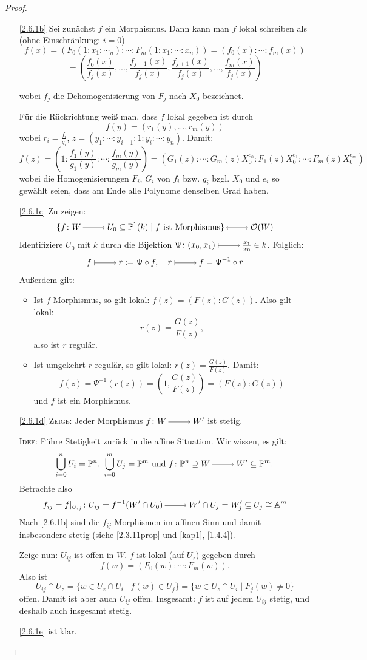 \documentclass[a4paper,12pt]{scrbook}
\theoremstyle{keinenummern} %
\theoremstyle{mitnummern}
\theoremstyle{unserbeweis}
\newtheorem{proof}{Beweis}
\def\A{\mathbb{A}}
\def\O{\mathcal{O}}
\def\P{\mathbb{P}}
\newcommand{\restrict}[1]{|_{#1}}
\renewcommand{\dotsc}{\ensuremath{\!...}}
\newcommand{\ra}{\raisebox{-1pt}{\tikz{\draw[thin,shorten >=3pt, ->] (0,0) node{\hspace*{-2pt}} -- node{} (1,0);}}\penalty1000\relax}
\renewcommand{\mapsto}{\raisebox{-1pt}{\tikz{\draw[thin,shorten >=3pt, |->] (0,0) node{\hspace*{0pt}} -- node{} (1,0);}}\penalty1000\relax}
\newcommand{\lra}{\raisebox{-1pt}{\tikz{\draw[thin,shorten >=3pt, <->] (0,0) node{\hspace*{-2pt}} -- node{} (1,0);}}\penalty1000\relax}
\begin{document}
\begin{proof}
  \begin{enumerate}
  \item[\ref{2.6.1b}] Sei zunächst $f$ ein Morphismus. Dann kann man $f$ lokal schreiben als (ohne Einschränkung: $i=0$)
\[f(x)=(F_0(1:x_1:\dotsm_n):\dotsm:F_m(1:x_1:\dotsm:x_n))=(f_0(x):\dotsm :f_m(x))\]
\[=(\frac {f_0(x)}{f_j(x)},\dotsc,\frac{f_{j-1}(x)}{f_j(x)},\frac{f_{j+1}(x)}{f_j(x)},\dotsc,\frac {f_m(x)}{f_j(x)})\]

wobei $f_j$ die Dehomogenisierung von $F_j$ nach $X_0$ bezeichnet.

Für die Rückrichtung weiß man, dass $f$ lokal gegeben ist durch 
\[f(y)=(r_1(y),\dotsc,r_m(y))\]
wobei $r_i=\frac{f_i}{g_i}$, $z=(y_1:\dotsm:y_{i-1}:1:y_i:\dotsm :y_n)$. Damit:
\[ f(z)=(1:\frac{f_1(y)}{g_1(y)}:\dotsm :\frac{f_m(y)}{g_m(y)})=(G_1(z):\dotsm :G_m(z)X_0^{e_0}:F_1(z)X_0^{e_1}: \dotsm :F_m(z)X_0^{e_m})\]
wobei die Homogenisierungen $F_i$, $G_i$ von $f_i$ bzw. $g_i$ bzgl. $X_0$ und $e_i$ so gewählt seien, dass am Ende alle Polynome denselben Grad haben.  
  \item[\ref{2.6.1c}] Zu zeigen:
\[\{f\colon W\ra U_0\subseteq \P^1(k) \mid f \text{ ist Morphismus}\} \lra \O(W)\]
Identifiziere $U_0$ mit $k$ durch die Bijektion $\Psi \colon (x_0,x_1)\mapsto \frac{x_1}{x_0} \in k$. Folglich:
\[f\mapsto r:=\Psi \circ f, \quad r\mapsto f=\Psi^{-1}\circ r\]
Außerdem gilt:\begin{itemize}
    \item Ist $f$ Morphismus, so gilt lokal: $f(z)=(F(z):G(z))$. Also gilt lokal: \[r(z)=\frac{G(z)}{F(z)},\] also ist $r$ regulär.
    \item Ist umgekehrt $r$ regulär, so gilt lokal: $r(z)=\frac{G(z)}{F(z)}$. Damit: 
\[f(z)=\Psi^{-1}(r(z))=(1,\frac{G(z)}{F(z)})=(F(z):G(z))\]
und $f$ ist ein Morphismus.\end{itemize}

  \item[\ref{2.6.1d}] {\scshape Zeige:} Jeder Morphismus $f\colon W\ra W'$ ist stetig.

 {\scshape Idee:} Führe Stetigkeit zurück in die affine Situation.
Wir wissen, es gilt:
\[\bigcup_{i=0}^{n}U_i=\P^n,\ \bigcup_{i=0}^{m}U_j=\P^m\text{ und } f\colon \P^n \supseteq W\ra W'\subseteq \P^m.\]
Betrachte also
\[ f_{ij}=f\restrict{U_{ij}} \colon U_{ij}=f^{-1}(W'\cap U_0)\ra W'\cap U_j=W_j'\subseteq U_j\cong \A^m\]
Nach \ref{2.6.1b} sind die $f_{ij}$ Morphismen im affinen Sinn und damit insbesondere stetig (siehe \cref{2.3.11prop} und \cref{kap1}, \cref{1.4.4}).

Zeige nun: $U_{ij}$ ist offen in $W$. $f$ ist lokal (auf $U_z$) gegeben durch 
\[f(w)=(F_0(w):\dotsm :F_m(w)).\]
Also ist 
\[U_{ij}\cap U_z=\{w \in U_z\cap U_i \mid f(w) \in U_j\}=\{w \in U_z\cap U_i \mid F_j(w)\neq 0\}\]
offen. Damit ist aber auch $U_{ij}$ offen.
Insgesamt: $f$ ist auf jedem $U_{ij}$ stetig, und deshalb auch insgesamt stetig.
  \item[\ref{2.6.1e}] ist klar.
  \end{enumerate}  
\end{proof}
\end{document}
